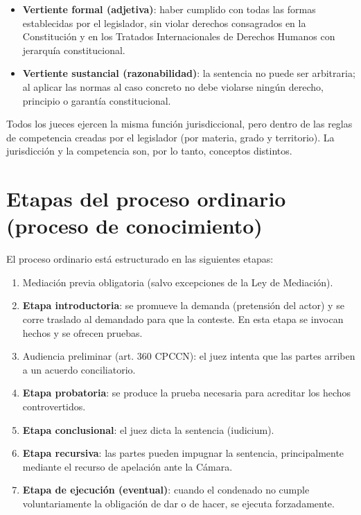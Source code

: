 \documentclass[12pt,oneside]{book}
\begin{document}
\begin{itemize}
    \item \textbf{Vertiente formal (adjetiva)}: haber cumplido con todas las formas establecidas por el legislador, sin violar derechos consagrados en la Constitución y en los Tratados Internacionales de Derechos Humanos con jerarquía constitucional.
    \item \textbf{Vertiente sustancial (razonabilidad)}: la sentencia no puede ser arbitraria; al aplicar las normas al caso concreto no debe violarse ningún derecho, principio o garantía constitucional.
\end{itemize}

\begin{note}
Todos los jueces ejercen la misma función jurisdiccional, pero dentro de las reglas de competencia creadas por el legislador (por materia, grado y territorio). La jurisdicción y la competencia son, por lo tanto, conceptos distintos.
\end{note}

\section{Etapas del proceso ordinario (proceso de conocimiento)}

El proceso ordinario está estructurado en las siguientes etapas:

\begin{enumerate}
    \item Mediación previa obligatoria (salvo excepciones de la Ley de Mediación).
    \item \textbf{Etapa introductoria}: se promueve la demanda (pretensión del actor) y se corre traslado al demandado para que la conteste. En esta etapa se invocan hechos y se ofrecen pruebas.
    \item Audiencia preliminar (art. 360 CPCCN): el juez intenta que las partes arriben a un acuerdo conciliatorio.
    \item \textbf{Etapa probatoria}: se produce la prueba necesaria para acreditar los hechos controvertidos.
    \item \textbf{Etapa conclusional}: el juez dicta la sentencia (iudicium).
    \item \textbf{Etapa recursiva}: las partes pueden impugnar la sentencia, principalmente mediante el recurso de apelación ante la Cámara.
    \item \textbf{Etapa de ejecución (eventual)}: cuando el condenado no cumple voluntariamente la obligación de dar o de hacer, se ejecuta forzadamente.
\end{enumerate}
\end{document}
